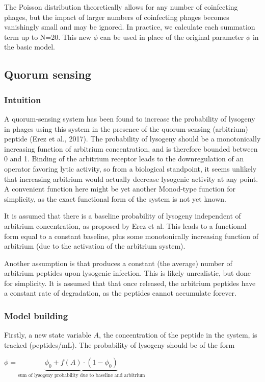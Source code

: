 \documentclass{article}
\begin{document}
 
The Poisson distribution theoretically allows for any number of coinfecting phages, but the impact of larger numbers of coinfecting phages becomes vanishingly small and may be ignored. In practice, we calculate each summation term up to N=20. This new $\phi$ can be used in place of the original parameter $\phi$ in the basic model.

\subsection{Quorum sensing}
\subsubsection{Intuition}
A quorum-sensing system has been found to increase the probability of lysogeny in phages using this system in the presence of the quorum-sensing (arbitrium) peptide (Erez et al., 2017). 
The probability of lysogeny should be a monotonically increasing function of arbitrium concentration, and is therefore bounded between 0 and 1. Binding of the arbitrium receptor leads to the downregulation of an operator favoring lytic activity, so from a biological standpoint, it seems unlikely that increasing arbitrium would actually decrease lysogenic activity at any point. A convenient function here might be yet another Monod-type function for simplicity, as the exact functional form of the system is not yet known. 

It is assumed that there is a baseline probability of lysogeny independent of arbitrium concentration, as proposed by Erez et al. This leads to a functional form equal to a constant baseline, plus some monotonically increasing function of arbitrium (due to the activation of the arbitrium system).

Another assumption is that produces a constant (the average) number of arbitrium peptides upon lysogenic infection. This is likely unrealistic, but done for simplicity. It is assumed that that once released, the arbitrium peptides have a constant rate of degradation, as the peptides cannot accumulate forever. 

\subsubsection{Model building}
Firstly, a new state variable $A$, the concentration of the peptide in the system, is tracked (peptides/mL). The probability of lysogeny should be of the form

\begin{center}
$ \phi = \underbrace{\phi_0 + f(A) \cdot (1-\phi_0)}_{\text{sum of lysogeny probability due to baseline and arbitrium}}$
\end{center}
\end{document}
